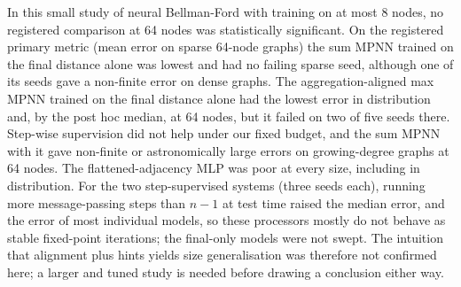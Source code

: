 In this small study of neural Bellman-Ford with training on at most 8 nodes, no registered comparison at 64 nodes was statistically significant. On the registered primary metric (mean error on sparse 64-node graphs) the sum MPNN trained on the final distance alone was lowest and had no failing sparse seed, although one of its seeds gave a non-finite error on dense graphs. The aggregation-aligned max MPNN trained on the final distance alone had the lowest error in distribution and, by the post hoc median, at 64 nodes, but it failed on two of five seeds there. Step-wise supervision did not help under our fixed budget, and the sum MPNN with it gave non-finite or astronomically large errors on growing-degree graphs at 64 nodes. The flattened-adjacency MLP was poor at every size, including in distribution. For the two step-supervised systems (three seeds each), running more message-passing steps than $n-1$ at test time raised the median error, and the error of most individual models, so these processors mostly do not behave as stable fixed-point iterations; the final-only models were not swept. The intuition that alignment plus hints yields size generalisation was therefore not confirmed here; a larger and tuned study is needed before drawing a conclusion either way.
